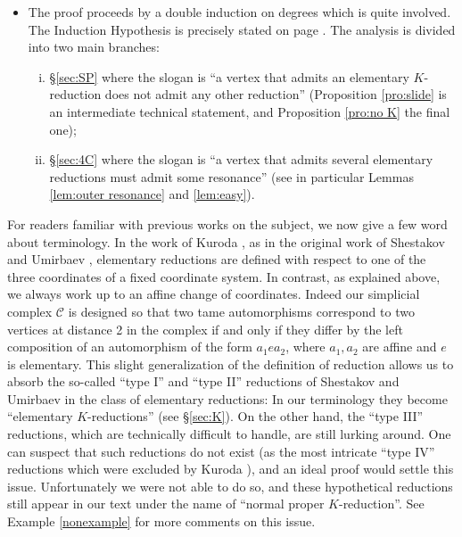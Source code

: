 \documentclass[reqno,oneside,11pt]{amsart}
\theoremstyle{plain}
\theoremstyle{definition}
\newcommand{\Comp}{\mathcal{C}}
\begin{document}
\begin{itemize}[wide]
\item The proof proceeds by a double induction on degrees which is quite involved.
The Induction Hypothesis is precisely stated on page \pageref{IH}.
The analysis is divided into two main branches:
\begin{enumerate}[(i), wide]
\item \S\ref{sec:SP} where the slogan is ``a vertex that admits an elementary $K$-reduction does not admit any other reduction'' (Proposition \ref{pro:slide} is an intermediate technical statement, and Proposition \ref{pro:no K} the final one);

\item \S\ref{sec:4C} where the slogan is ``a vertex that admits several
elementary reductions must admit some resonance'' (see in particular Lemmas \ref{lem:outer resonance} and \ref{lem:easy}).
\end{enumerate}
\end{itemize}

For readers familiar with previous works on the subject, we now give a few word about terminology. 
In the work of Kuroda \cite{Ku:main}, as in the original work of Shestakov and Umirbaev \cite{SU:main}, elementary reductions are defined with respect to one of the three coordinates of a fixed coordinate system.
In contrast, as explained above, we always work up to an affine change of
coordinates.
Indeed our simplicial complex $\Comp$ is designed so that two tame
automorphisms correspond to two vertices at distance 2 in the complex if and
only if they differ by the left composition of an automorphism of the form $a_1 e
a_2$, where $a_1, a_2$ are affine and $e$ is elementary.
This slight generalization of the definition of reduction allows us to absorb the so-called ``type I'' and ``type II'' reductions of Shestakov and Umirbaev in the class of elementary reductions: In our terminology they become ``elementary $K$-reductions'' (see \S \ref{sec:K}).
On the other hand, the ``type III'' reductions, which are technically difficult to handle, are still lurking around.
One can suspect that such reductions do not exist (as the most intricate ``type IV'' reductions which were excluded by Kuroda \cite{Ku:main}), and an ideal proof would settle this issue.
Unfortunately we were not able to do so, and these hypothetical reductions still appear in our text under the name of ``normal proper $K$-reduction''.
See Example \ref{nonexample} for more comments on this issue.
\end{document}
